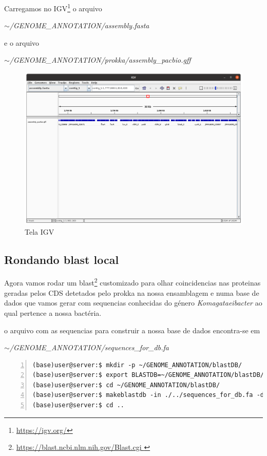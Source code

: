 \documentclass[letter,11pt]{book}
\begin{document}
Carregamos no IGV\footnote{\url{https://igv.org/}} o arquivo 



\emph{$\sim$/GENOME\_ANNOTATION/assembly.fasta}

e o arquivo

\emph{$\sim$/GENOME\_ANNOTATION/prokka/assembly\_pacbio.gff}

\begin{figure}[ht]
\centering
   \includegraphics[width=12cm]{Figs/igv_gff.png}
  \caption[Visualização do arquivo de anotações .gff na ensamblagem]{\label{IGV}Tela IGV}
\end{figure}


\subsection{Rondando blast local}

Agora vamos rodar um blast\footnote{\url{https://blast.ncbi.nlm.nih.gov/Blast.cgi
}} customizado para olhar coincidencias nas proteinas geradas pelos CDS detetados pelo prokka na nossa ensamblagem e numa base de dados que vamos gerar com sequencias conhecidas do género \emph{Komagataeibacter} ao qual pertence a nossa bactéria.

o arquivo com as sequencias para construir a nossa base de dados encontra-se em 

\emph{$\sim$/GENOME\_ANNOTATION/sequences\_for\_db.fa}

\begin{Verbatim}[commandchars=!\{\}, numbers=left,label= Criando base de dados customizada para o blast ,frame=topline,fontsize=\scriptsize]
(base)user@server:$ mkdir -p ~/GENOME_ANNOTATION/blastDB/
(base)user@server:$ export BLASTDB=~/GENOME_ANNOTATION/blastDB/
(base)user@server:$ cd ~/GENOME_ANNOTATION/blastDB/
(base)user@server:$ makeblastdb -in ./../sequences_for_db.fa -dbtype 'prot' -out myDB
(base)user@server:$ cd ..
\end{Verbatim}
\end{document}
